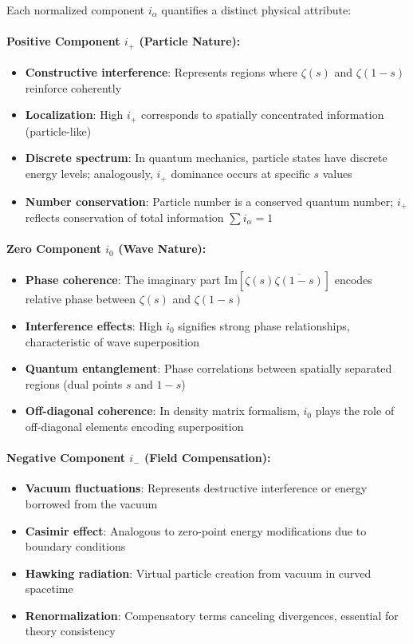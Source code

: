 \documentclass[12pt]{article}
\theoremstyle{plain}
\theoremstyle{definition}
\begin{document}
Each normalized component $i_\alpha$ quantifies a distinct physical attribute:

\paragraph{Positive Component $i_+$ (Particle Nature):}
\begin{itemize}
\item \textbf{Constructive interference}: Represents regions where $\zeta(s)$ and $\zeta(1-s)$ reinforce coherently
\item \textbf{Localization}: High $i_+$ corresponds to spatially concentrated information (particle-like)
\item \textbf{Discrete spectrum}: In quantum mechanics, particle states have discrete energy levels; analogously, $i_+$ dominance occurs at specific $s$ values
\item \textbf{Number conservation}: Particle number is a conserved quantum number; $i_+$ reflects conservation of total information $\sum i_\alpha = 1$
\end{itemize}

\paragraph{Zero Component $i_0$ (Wave Nature):}
\begin{itemize}
\item \textbf{Phase coherence}: The imaginary part $\text{Im}[\zeta(s)\overline{\zeta(1-s)}]$ encodes relative phase between $\zeta(s)$ and $\zeta(1-s)$
\item \textbf{Interference effects}: High $i_0$ signifies strong phase relationships, characteristic of wave superposition
\item \textbf{Quantum entanglement}: Phase correlations between spatially separated regions (dual points $s$ and $1-s$)
\item \textbf{Off-diagonal coherence}: In density matrix formalism, $i_0$ plays the role of off-diagonal elements encoding superposition
\end{itemize}

\paragraph{Negative Component $i_-$ (Field Compensation):}
\begin{itemize}
\item \textbf{Vacuum fluctuations}: Represents destructive interference or energy borrowed from the vacuum
\item \textbf{Casimir effect}: Analogous to zero-point energy modifications due to boundary conditions
\item \textbf{Hawking radiation}: Virtual particle creation from vacuum in curved spacetime
\item \textbf{Renormalization}: Compensatory terms canceling divergences, essential for theory consistency
\end{itemize}
\end{document}
